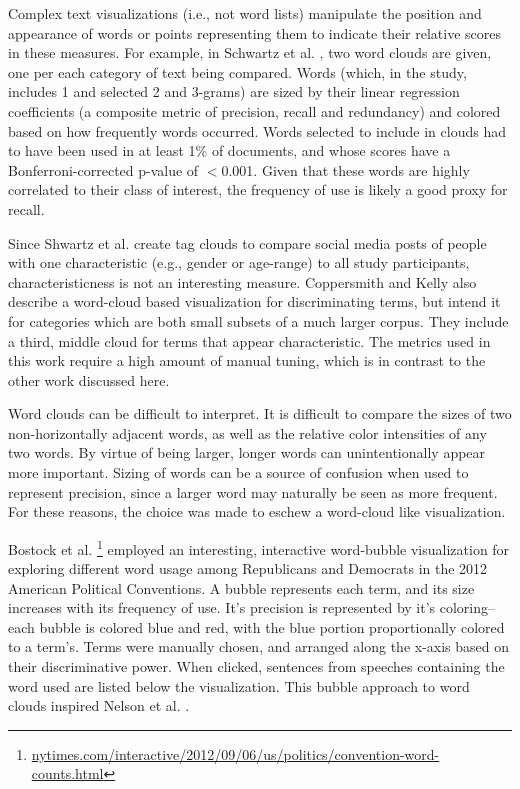 \documentclass[11pt,a4paper]{article}
\begin{document}
Complex text visualizations (i.e., not word lists) manipulate the position and appearance of words or points representing them to indicate their relative scores in these measures. For example, in Schwartz et al. , two word clouds are given, one per each category of text being compared.  Words (which, in the study, includes 1 and selected 2 and 3-grams) are sized by their linear regression coefficients (a composite metric of precision, recall and redundancy) and colored based on how frequently words occurred.  Words selected to include in clouds had to have been used in at least 1\% of documents, and whose scores have a Bonferroni-corrected p-value of $<$0.001. Given that these words are highly correlated to their class of interest, the frequency of use is likely a good proxy for recall.

Since Shwartz et al.  create tag clouds to compare social media posts of people with one characteristic (e.g., gender or age-range) to all study participants,  characteristicness is not an interesting measure.  Coppersmith and Kelly  also describe a word-cloud based visualization for discriminating terms, but intend it for categories which are both small subsets of a much larger corpus. They include a third, middle cloud for terms that appear characteristic.  The metrics used in this work require a high amount of manual tuning, which is in contrast to the other work discussed here.

Word clouds can be difficult to interpret.  It is difficult to compare the sizes of two non-horizontally adjacent words,  as well as the relative color intensities of any two words. By virtue of being larger, longer words can unintentionally appear more important.  Sizing of words can be a source of confusion when used to represent precision, since a larger word may naturally be seen as more frequent.  For these reasons, the choice was made to eschew a word-cloud like visualization.

Bostock et al. \footnote{\href{http://www.nytimes.com/interactive/2012/09/06/us/politics/convention-word-counts.html}{nytimes.com/interactive/2012/09/06/us/politics/convention-word-counts.html}} employed an interesting, interactive word-bubble visualization for exploring different word usage among Republicans and Democrats in the 2012 American Political Conventions.  A bubble represents each term, and its size increases with its frequency of use.  It's precision is represented by it's coloring-- each bubble is colored blue and red, with the blue portion proportionally colored to a term's.  Terms were manually chosen, and arranged along the x-axis based on their discriminative power. When clicked, sentences from speeches containing the word used are listed below the visualization.  This bubble approach to word clouds inspired Nelson et al. .
\end{document}
